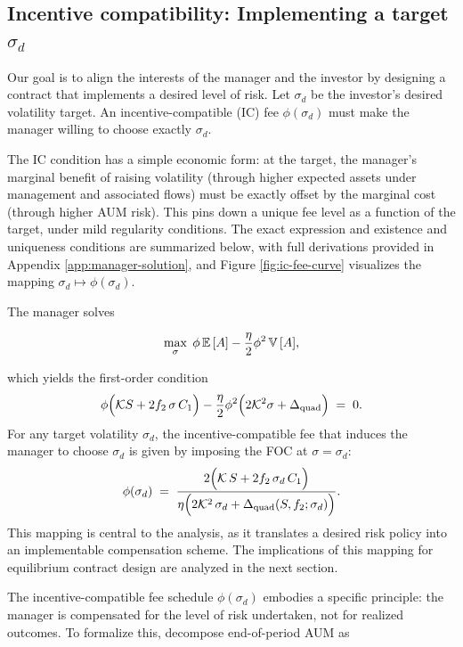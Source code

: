 \subsection{\texorpdfstring{Incentive compatibility: Implementing a
target
\(\sigma_d\)}{Incentive compatibility: Implementing a target \textbackslash sigma\_d}}\label{subsec:IC}

Our goal is to align the interests of the manager and the investor by
designing a contract that implements a desired level of risk. Let
\(\sigma_d\) be the investor's desired volatility target. An
incentive-compatible (IC) fee \(\phi(\sigma_d)\) must make the manager
willing to choose exactly \(\sigma_d\).

The IC condition has a simple economic form: at the target, the
manager's marginal benefit of raising volatility (through higher
expected assets under management and associated flows) must be exactly
offset by the marginal cost (through higher AUM risk). This pins down a
unique fee level as a function of the target, under mild regularity
conditions. The exact expression and existence and uniqueness conditions
are summarized below, with full derivations provided in Appendix
\ref{app:manager-solution}, and Figure \ref{fig:ic-fee-curve} visualizes
the mapping \(\sigma_d\mapsto \phi(\sigma_d)\).

The manager solves

\[
\max_\sigma \; \phi\,{\mathbb{E}}\,[A] - \frac{\eta}{2}\phi^2\,{\mathbb{V}}\,[A],
\]

which yields the first-order condition \begin{equation}
\phi\Big(\mathcal{K} S + 2 f_2\,\sigma\,C_1\Big) - \frac{\eta}{2}\phi^2\Big(2 \mathcal{K}^2 \sigma + \Delta_{\text{quad}}\Big) \;=\; 0.
\label{eq:manager-FOC}
\end{equation} For any target volatility \(\sigma_d\), the
incentive-compatible fee that induces the manager to choose \(\sigma_d\)
is given by imposing the FOC at \(\sigma=\sigma_d\): \begin{equation}
\label{eq:phi-IC}
\phi(\sigma_d)
\;=\;
\frac{2\Big(\mathcal{K}\,S + 2 f_2 \,\sigma_d\,C_1\Big)}
{\eta\Big(2 \mathcal{K}^2 \,\sigma_d + \Delta_{\text{quad}}(S,f_2;\sigma_d)\Big)}.
\end{equation} This mapping is central to the analysis, as it translates
a desired risk policy into an implementable compensation scheme. The
implications of this mapping for equilibrium contract design are
analyzed in the next section.

The incentive-compatible fee schedule \(\phi(\sigma_d)\) embodies a
specific principle: the manager is compensated for the level of risk
undertaken, not for realized outcomes. To formalize this, decompose
end-of-period AUM as

